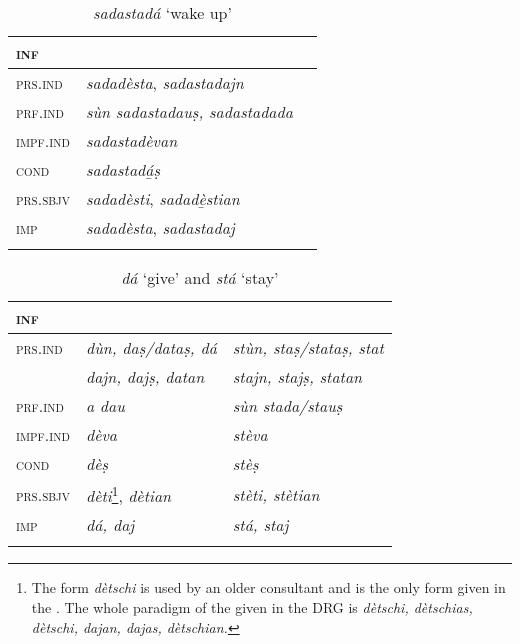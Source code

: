 \begin{table}
	\caption{\textit{\textit{sadastadá}} `wake up'}
\label{tab:sadastada}
	\begin{tabular}{lll}
		\lsptoprule
		\textsc{inf} & \isi{\textit{\textbf{sadastadá}}}\\
		\midrule
		\textsc{prs.ind} & \textit{sadadèsta}, \textit{sadastadajn} \\
		\textsc{prf.ind} & \textit{sùn sadastadauṣ, sadastadada}\\
		\textsc{impf.ind} & \textit{sadastadèvan}\\
		\textsc{cond} & \textit{sadastadá̱ṣ}\\
		\textsc{prs.sbjv} & \textit{sadadèsti}, \textit{sadadè̱stian}\\
		\textsc{imp} & \textit{sadadèsta}, \textit{sadastadaj}\\
		\lspbottomrule
	\end{tabular}
\end{table}



\begin{table}
	\caption{\textit{dá} `give' and \textit{stá} `stay'}

	\begin{tabular}{lll}
		\lsptoprule
		\textsc{inf} & \isi{\textit{\textbf{dá}}} & \isi{\textit{\textbf{stá}}}\\
		\midrule
		
		\textsc{prs.ind} & \textit{dùn, daṣ/dataṣ, dá} & \textit{stùn, staṣ/stataṣ, stat}\\
		& \textit{dajn, dajṣ, datan} & \textit{stajn, stajṣ, statan}\\
		\textsc{prf.ind} & \textit{a dau} & \textit{sùn stada/stauṣ}\\
		\textsc{impf.ind} & \textit{dèva} & \textit{stèva}\\
		\textsc{cond} & \textit{dèṣ} & \textit{stèṣ}\\
		\textsc{prs.sbjv}	& \textit{dèti}\footnote{The form \textit{dètschi} is used by an older consultant and is the only form given in the \DRG{5}{65}. The whole paradigm of the \isi{present subjunctive} given in the DRG is \textit{dètschi, dètschias, dètschi, dajan, dajas, dètschian.}}, \textit{dètian} & \textit{stèti, stètian}\\
		\textsc{imp} & \textit{dá, daj} & \textit{stá, staj}\\
		\lspbottomrule
	\end{tabular}
\end{table}



